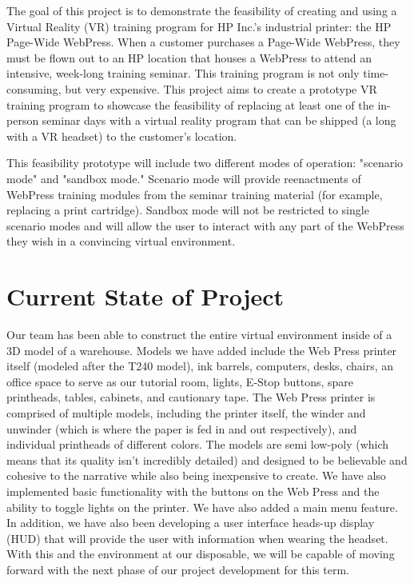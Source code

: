 \documentclass[onecolumn, draftclsnofoot,10pt, compsoc]{IEEEtran}
\begin{document}
The goal of this project is to demonstrate the feasibility of creating and using a Virtual Reality (VR) training program for HP Inc.'s industrial printer: the HP Page-Wide WebPress. When a customer purchases a Page-Wide WebPress, they must be flown out to an HP location that houses a WebPress to attend an intensive, week-long training seminar. This training program is not only time-consuming, but very expensive. This project aims to create a prototype VR training program to showcase the feasibility of replacing at least one of the in-person seminar days with a virtual reality program that can be shipped (a long with a VR headset) to the customer's location.

This feasibility prototype will include two different modes of operation: "scenario mode" and "sandbox mode." Scenario mode will provide reenactments of WebPress training modules from the seminar training material (for example, replacing a print cartridge). Sandbox mode will not be restricted to single scenario modes and will allow the user to interact with any part of the WebPress they wish in a convincing virtual environment.

\section{Current State of Project}

Our team has been able to construct the entire virtual environment inside of a 3D model of a warehouse. Models we have added include the Web Press printer itself (modeled after the T240 model), ink barrels, computers, desks, chairs, an office space to serve as our tutorial room, lights, E-Stop buttons, spare printheads, tables, cabinets, and cautionary tape. The Web Press printer is comprised of multiple models, including the printer itself, the winder and unwinder (which is where the paper is fed in and out respectively), and individual printheads of different colors. The models are semi low-poly (which means that its quality isn't incredibly detailed) and designed to be believable and cohesive to the narrative while also being inexpensive to create. We have also implemented basic functionality with the buttons on the Web Press and the ability to toggle lights on the printer. We have also added a main menu feature. In addition, we have also been developing a user interface heads-up display (HUD) that will provide the user with information when wearing the headset. With this and the environment at our disposable, we will be capable of moving forward with the next phase of our project development for this term. 
\end{document}

